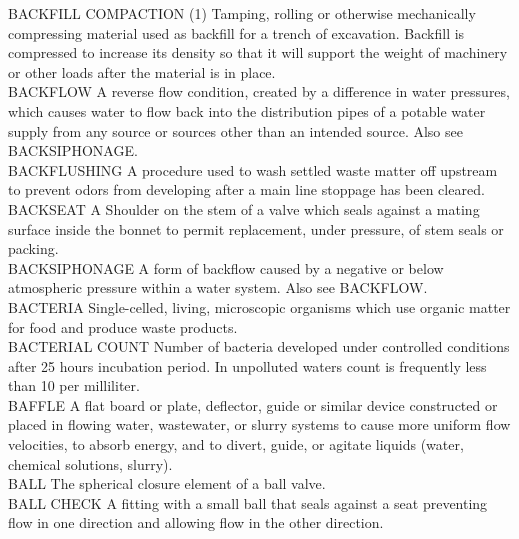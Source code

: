 BACKFILL COMPACTION
(1) Tamping, rolling or otherwise mechanically compressing material used as backfill for a trench of excavation. Backfill is compressed to increase its density so that it will support the weight of machinery or other loads after the material is in place. 
\vspace{0.3cm}\\
BACKFLOW
A reverse flow condition, created by a difference in water pressures, which causes water to flow back into the distribution pipes of a potable water supply from any source or sources other than an intended source. Also see BACKSIPHONAGE.
\vspace{0.3cm}\\
BACKFLUSHING
A procedure used to wash settled waste matter off upstream to prevent odors from developing after a main line stoppage has been cleared. 
\vspace{0.3cm}\\
BACKSEAT
A Shoulder on the stem of a valve which seals against a mating surface inside the bonnet to permit replacement, under pressure, of stem seals or packing.
\vspace{0.3cm}\\
BACKSIPHONAGE
A form of backflow caused by a negative or below atmospheric pressure within a water system. Also see BACKFLOW.
\vspace{0.3cm}\\
BACTERIA
Single-celled, living, microscopic organisms which use organic matter for food and produce waste products.
\vspace{0.3cm}\\
BACTERIAL COUNT
Number of bacteria developed under controlled conditions after 25 hours incubation period. In unpolluted waters count is frequently less than 10 per milliliter.
\vspace{0.3cm}\\
BAFFLE
A flat board or plate, deflector, guide or similar device constructed or placed in flowing water, wastewater, or slurry systems to cause more uniform flow velocities, to absorb energy, and to divert, guide, or agitate liquids (water, chemical solutions, slurry).
\vspace{0.3cm}\\
BALL
The spherical closure element of a ball valve.
\vspace{0.3cm}\\
BALL CHECK
A fitting with a small ball that seals against a seat preventing flow in one direction and allowing flow in the other direction.
\vspace{0.3cm}\\
